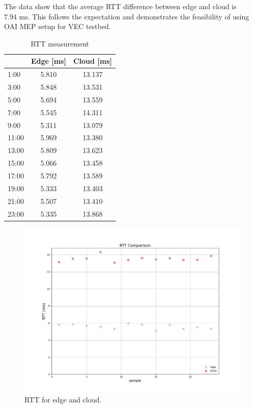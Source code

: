 \documentclass[12pt,a4paper,twoside]{report}
\begin{document}
The data show that the average RTT difference between edge and cloud is $7.94 \mbox{ ms}$. This follows the expectation and demonstrates the feasibility of using OAI MEP setup for VEC testbed.
%
\begin{table}[!ht]
    \centering
	\caption{RTT measurement}
	\label{T:ping}
    \begin{tabular}{|l|c|c|}
    \hline
        & \textbf{Edge [ms]} & \textbf{Cloud [ms]} \\ \hline
        1:00 & 5.810 & 13.137 \\ \hline
        3:00 & 5.848 & 13.531 \\ \hline
        5:00 & 5.694 & 13.559 \\ \hline
        7:00 & 5.545 & 14.311 \\ \hline
        9:00 & 5.311 & 13.079 \\ \hline
        11:00 & 5.969 & 13.380 \\ \hline
        13:00 & 5.809 & 13.623 \\ \hline
        15:00 & 5.066 & 13.458 \\ \hline
        17:00 & 5.792 & 13.589 \\ \hline
        19:00 & 5.333 & 13.403 \\ \hline
        21:00 & 5.507 & 13.410 \\ \hline
        23:00 & 5.335 & 13.868 \\ \hline
    \end{tabular}
\end{table}
%
\begin{figure}[ht]
	\centering
	\captionsetup{labelsep=colon,name=Graph}
	\includegraphics[width=13cm]{./images/RTT-comparison.png} 
	\caption{RTT for edge and cloud.}
	\label{G:pings-scatt}
\end{figure}
\end{document}
